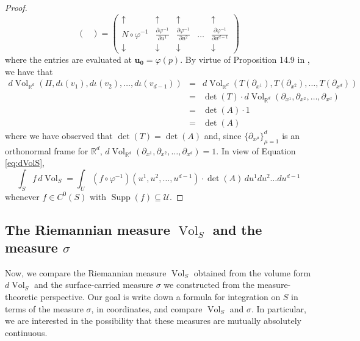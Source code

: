 \documentclass{article}
\newcommand\supp{\operatorname{Supp}}
\renewcommand\det{\operatorname{det}}
\newcommand{\p}{\partial}
\newcommand{\R}{\mathbb{R}}
\newcommand{\f}[2]{\frac{#1}{#2}}
\theoremstyle{theorem}
\newcommand{\Vol}{\operatorname{Vol}}
\begin{document}
\begin{proof}
\begin{equation*}
\begin{pmatrix}
    \end{pmatrix} =
    \begin{pmatrix}
    \uparrow &\uparrow & \uparrow &   &\uparrow \\ 
    N \circ \varphi^{-1} &\f{\p \varphi^{-1}}{\p u^1}& \f{\p \varphi^{-1}}{\p u^2}  &\dots&\f{\p \varphi^{-1}}{\p u^{d-1}}\\
    \downarrow  &\downarrow  & \downarrow &    &\downarrow 
    \end{pmatrix}
\end{equation*}
where the entries are evaluated at $\mathbf{u_0}= \varphi(p)$. By virtue of Proposition 14.9 in \cite{lee2013smooth}, we have that
\begin{eqnarray*}
    d\Vol_{\R^d}(\Pi, d\iota(v_1),d\iota(v_2),\dots, d\iota(v_{d-1})) &=& d\Vol_{\R^d}(T(\p_{x^1}), T(\p_{x^2}),\dots, T(\p_{x^{d}})) \\
    &=& \det(T) \cdot d\Vol_{\R^d}(\p_{x^1}, \p_{x^2}, \dots, \p_{x^{d}}) \\ 
    &=& \det(A) \cdot 1 \\
    &=& \det(A)
\end{eqnarray*}
where we have observed that $\det(T) = \det(A)$ and, since $\{ \p_{x^\mu} \}_{\mu=1}^{d}$ is an orthonormal frame for $\R^d$, $d\Vol_{\R^d}(\partial_{x^1},\partial_{x^2},\dots,\partial_{x^d})=1$. In view of Equation \ref{eq:dVolS}, 
\begin{equation*}
\int_S f\,d\Vol_S=\int_U (f\circ \varphi^{-1})(u^1,u^2,\dots,u^{d-1}) \cdot \det(A) \, du^1du^2\dots du^{d-1}
\end{equation*}
whenever $f\in C^0(S)$ with $\supp(f)\subseteq \mathcal{U}$.
\end{proof}



\subsection{The Riemannian measure $\Vol_S$ and the measure $\sigma$}

Now, we compare the Riemannian measure $\Vol_S$ obtained from the volume form $d\Vol_S$ and the surface-carried measure $\sigma$ we constructed from the measure-theoretic perspective. Our goal is write down a formula for integration on $S$ in terms of the measure $\sigma$, in coordinates, and compare $\Vol_S$ and $\sigma$. In particular, we are interested in the possibility that these measures are mutually absolutely continuous. \\
\end{document}
